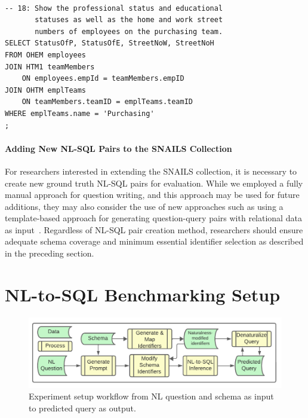 \begin{verbatim}
  
-- 18: Show the professional status and educational 
       statuses as well as the home and work street 
       numbers of employees on the purchasing team.
SELECT StatusOfP, StatusOfE, StreetNoW, StreetNoH
FROM OHEM employees
JOIN HTM1 teamMembers 
    ON employees.empId = teamMembers.empID
JOIN OHTM emplTeams 
    ON teamMembers.teamID = emplTeams.teamID
WHERE emplTeams.name = 'Purchasing'
;
\end{verbatim}

\paragraph{\textbf{Adding New NL-SQL Pairs to the SNAILS Collection}}
For researchers interested in extending the SNAILS collection, it is necessary to create new ground truth NL-SQL pairs for evaluation. 
While we employed a fully manual approach for question writing, and this approach may be used for future additions, they may also consider the use of new approaches such as using a template-based approach for generating question-query pairs with relational data as input~\cite{10.5555/3666122.3667470}.
Regardless of NL-SQL pair creation method, researchers should ensure adequate schema coverage and minimum essential identifier selection as described in the preceding section.


\section{NL-to-SQL Benchmarking Setup}

\label{section:nl-to-sql-benchmarking-setup}

\begin{figure}[!h]
  \centering
  \includegraphics[width=\figwidthmod\linewidth]{figures/section-5-process-header.pdf}
  \caption{Experiment setup workflow from NL question and schema as input to predicted query as output.}
  \label{fig:section-5-process-header}
\end{figure}

